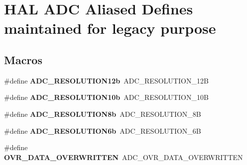 \hypertarget{group___h_a_l___a_d_c___aliased___defines}{}\section{H\+AL A\+DC Aliased Defines maintained for legacy purpose}
\label{group___h_a_l___a_d_c___aliased___defines}
\subsection*{Macros}
\begin{DoxyCompactItemize}
\item 
\mbox{\label{group___h_a_l___a_d_c___aliased___defines_ga6d328c588ea6f273ca698d48441a2a71}} 
\#define {\bfseries A\+D\+C\+\_\+\+R\+E\+S\+O\+L\+U\+T\+I\+O\+N12b}~A\+D\+C\+\_\+\+R\+E\+S\+O\+L\+U\+T\+I\+O\+N\+\_\+12B
\item 
\mbox{\label{group___h_a_l___a_d_c___aliased___defines_gaa695d7ca46602fd4317d5f6a7a2ee071}} 
\#define {\bfseries A\+D\+C\+\_\+\+R\+E\+S\+O\+L\+U\+T\+I\+O\+N10b}~A\+D\+C\+\_\+\+R\+E\+S\+O\+L\+U\+T\+I\+O\+N\+\_\+10B
\item 
\mbox{\label{group___h_a_l___a_d_c___aliased___defines_ga96b87d1645b3ae2e4af88daa006decc4}} 
\#define {\bfseries A\+D\+C\+\_\+\+R\+E\+S\+O\+L\+U\+T\+I\+O\+N8b}~A\+D\+C\+\_\+\+R\+E\+S\+O\+L\+U\+T\+I\+O\+N\+\_\+8B
\item 
\mbox{\label{group___h_a_l___a_d_c___aliased___defines_gaeaba9f99d20e7305507044f975925622}} 
\#define {\bfseries A\+D\+C\+\_\+\+R\+E\+S\+O\+L\+U\+T\+I\+O\+N6b}~A\+D\+C\+\_\+\+R\+E\+S\+O\+L\+U\+T\+I\+O\+N\+\_\+6B
\item 
\mbox{\label{group___h_a_l___a_d_c___aliased___defines_ga46d2fd3222a716456b74ad881eb34039}} 
\#define {\bfseries O\+V\+R\+\_\+\+D\+A\+T\+A\+\_\+\+O\+V\+E\+R\+W\+R\+I\+T\+T\+EN}~A\+D\+C\+\_\+\+O\+V\+R\+\_\+\+D\+A\+T\+A\+\_\+\+O\+V\+E\+R\+W\+R\+I\+T\+T\+EN
\item 
\mbox{\label{group___h_a_l___a_d_c___aliased___defines_ga1fb9c5eb49053187ac90c0af92662be6}} 

\end{DoxyCompactItemize}

